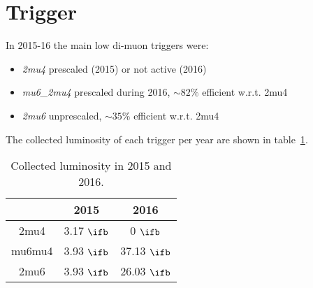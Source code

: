 \section{Trigger}
\label{sec:Trigger}

In 2015-16 the main low \pt di-muon triggers were:
\begin{itemize}
\item {\it 2mu4} prescaled (2015) or not active (2016)
\item {\it mu6\_2mu4} prescaled during 2016, $\sim 82\%$ efficient w.r.t. 2mu4
\item {\it 2mu6} unprescaled, $\sim 35\%$ efficient w.r.t. 2mu4
\end{itemize}
The collected luminosity of each trigger per year are shown in table~\ref{table:collectedLumi}.
\begin{table}[h]
  \begin{center}
    \begin{tabular}{| c | c | c |}
      \hline
          &   2015  &  2016 \\  \hline
      2mu4 &  3.17 $\ifb$  & 0 $\ifb$ \\ \hline
      mu6mu4 & 3.93  $\ifb$  & 37.13 $\ifb$ \\ \hline
      2mu6 &  3.93  $\ifb$ & 26.03 $\ifb$ \\ \hline
   \end{tabular}
    \caption{Collected luminosity in 2015 and 2016.}
    \label{table:collectedLumi}
  \end{center}
\end{table}


